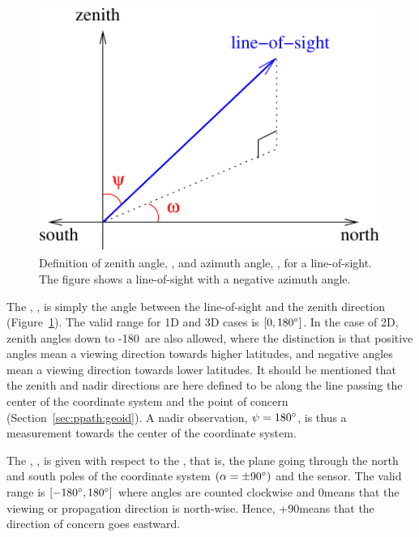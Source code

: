 \begin{figure}[!t]
 \begin{center}
  \begin{minipage}[c]{0.6\textwidth}
   \includegraphics*[width=0.99\hsize]{Figs/fm_definitions/za_and_aa_angles}
  \end{minipage}%
  \begin{minipage}[c]{0.4\textwidth}
   \caption{Definition of zenith angle, \ZntAng, and azimuth angle, 
       \AzmAng, for a line-of-sight. The figure shows a line-of-sight
       with a negative azimuth angle.}
   \label{fig:fm_defs:los}
  \end{minipage}
 \end{center}
\end{figure}           
 
The , \ZntAng, is simply the angle between the
line-of-sight and the zenith direction (Figure~\ref{fig:fm_defs:los}).
The valid range for 1D and 3D cases is $[0,180^\circ]$. In the case
of 2D, zenith angles down to -180\degree\ are also allowed, where the
distinction is that positive angles mean a viewing direction towards
higher latitudes, and negative angles mean a viewing direction towards
lower latitudes. It should be mentioned that the zenith and nadir
directions are here defined to be along the line passing the center of
the coordinate system and the point of concern
(Section~\ref{sec:ppath:geoid}). A nadir observation,
$\psi=180^\circ$, is thus a measurement towards the center of the
coordinate system.

The , \AzmAng, is given with respect to the
, that is, the plane going through the north
and south poles of the coordinate system $(\alpha=\pm90^\circ)$ and the
sensor. The valid range is $[-180^\circ,180^\circ]$ where angles are
counted clockwise and 0\degree means that the viewing or propagation
direction is north-wise.  Hence, +90\degree means that the direction
of concern goes eastward.

